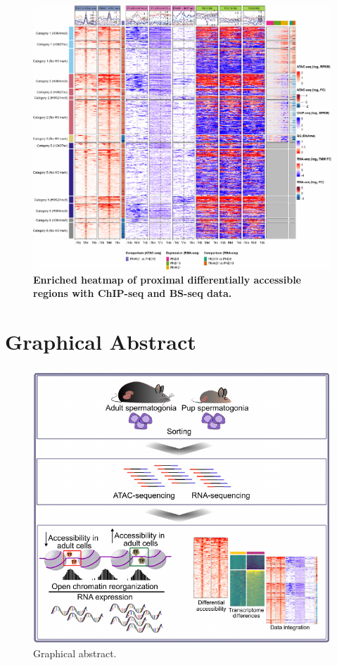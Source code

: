 \documentclass[12pt,twoside]{reedthesis}
\begin{document}
\begin{figure}[H]

{\centering \includegraphics{thesis_files/figure-latex/dn7-1} 

}

\caption[Enriched heatmap of proximal DARs with ChIP-seq and BS-seq data]{\textbf{Enriched heatmap of proximal differentially accessible regions with ChIP-seq and BS-seq data.}}\label{fig:dn7}
\end{figure}
\hypertarget{graphical-abstract}{%
\section{Graphical Abstract}\label{graphical-abstract}}
\begin{figure}[H]

{\centering \includegraphics{thesis_files/figure-latex/dga-1} 

}

\caption[Graphical abstract]{Graphical abstract.}\label{fig:dga}
\end{figure}
\newpage
\end{document}
